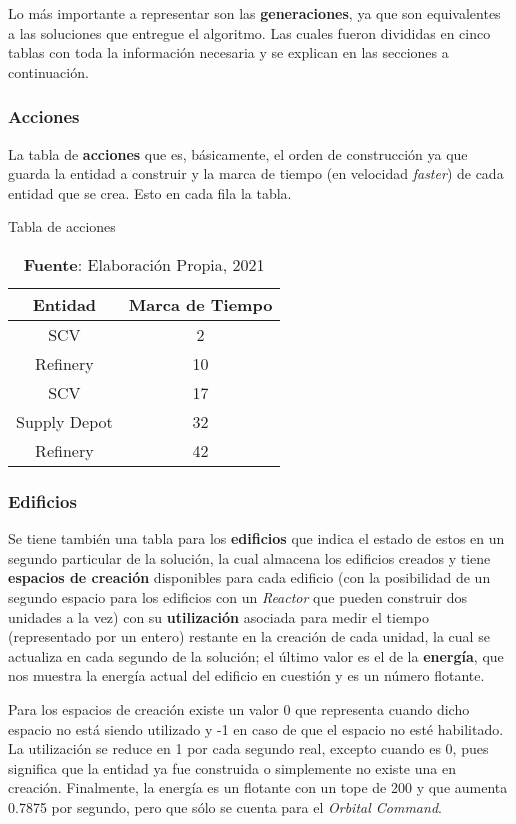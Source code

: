 Lo más importante a representar son las \textbf{generaciones}, ya que son equivalentes a las soluciones que entregue el algoritmo. Las cuales fueron divididas en cinco tablas con toda la información necesaria y se explican en las secciones a continuación.

\subsubsection{Acciones}

La tabla de \textbf{acciones} que es, básicamente, el orden de construcción ya que guarda la entidad a construir y la marca de tiempo (en velocidad \textit{faster}) de cada entidad que se crea. Esto en cada fila la tabla.

\begin{table}[H]
\centering
\def\arraystretch{1.8}
\captionsetup{justification=centering}
\caption{Tabla de acciones}
\label{tab:4}
\begin{tabular}{|c|c|}
\hline
\textbf{Entidad} & \textbf{Marca de Tiempo} \\
\hline
SCV & 2 \\ \hline
Refinery & 10 \\ \hline
SCV & 17 \\ \hline
Supply Depot & 32 \\ \hline
Refinery & 42 \\ \hline
\end{tabular}
\caption*{\textbf{Fuente}: Elaboración Propia, 2021}
\end{table}

\subsubsection{Edificios}

Se tiene también una tabla para los \textbf{edificios} que indica el estado de estos en un segundo particular de la solución, la cual almacena los edificios creados y tiene \textbf{espacios de creación} disponibles para cada edificio (con la posibilidad de un segundo espacio para los edificios con un \textit{Reactor} que pueden construir dos unidades a la vez) con su \textbf{utilización} asociada para medir el tiempo (representado por un entero) restante en la creación de cada unidad, la cual se actualiza en cada segundo de la solución; el último valor es el de la \textbf{energía}, que nos muestra la energía actual del edificio en cuestión y es un número flotante.

Para los espacios de creación existe un valor 0 que representa cuando dicho espacio no está siendo utilizado y -1 en caso de que el espacio no esté habilitado. La utilización se reduce en 1 por cada segundo real, excepto cuando es 0, pues significa que la entidad ya fue construida o simplemente no existe una en creación. Finalmente, la energía es un flotante con un tope de 200 y que aumenta 0.7875 por segundo, pero que sólo se cuenta para el \textit{Orbital Command}.

